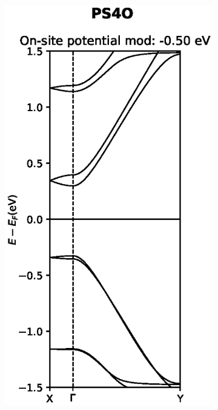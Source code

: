 \begin{figure}[h]
\begin{subfigure}[b]{0.3\textwidth}
    \vspace{-2.5\baselineskip}
    \caption{}
    \label{PS4Odevnomod}
    \end{subfigure}
    ~
    \begin{subfigure}[b]{0.3\textwidth}
    \centering
    \includegraphics[width=\textwidth]{Figures/PS4Omod.eps}
    \vspace{-2.5\baselineskip}

\end{subfigure}
\end{figure}
